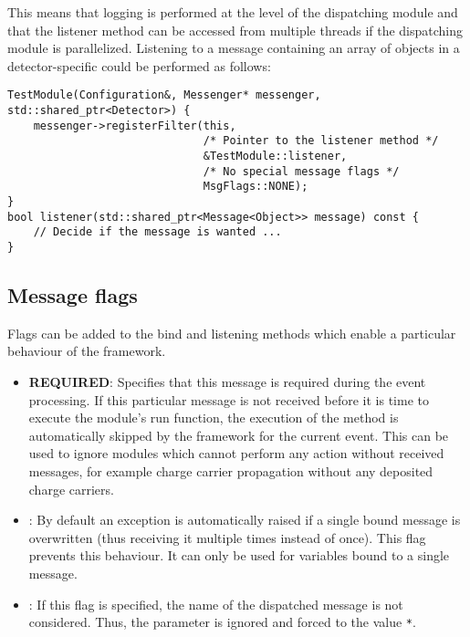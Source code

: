 \begin{enumerate}
This means that logging is performed at the level of the dispatching module and that the listener method can be accessed from multiple threads if the dispatching module is parallelized.
Listening to a message containing an array of objects in a detector-specific  could be performed as follows:
\begin{verbatim}
TestModule(Configuration&, Messenger* messenger, std::shared_ptr<Detector>) {
    messenger->registerFilter(this,
                              /* Pointer to the listener method */
                              &TestModule::listener,
                              /* No special message flags */
                              MsgFlags::NONE);
}
bool listener(std::shared_ptr<Message<Object>> message) const {
    // Decide if the message is wanted ...
}
\end{verbatim}
\end{enumerate}

\subsection{Message flags}
Flags can be added to the bind and listening methods which enable a particular behaviour of the framework.
\begin{itemize}
    \item \textbf{REQUIRED}: Specifies that this message is required during the event processing.
    If this particular message is not received before it is time to execute the module's run function, the execution of the method is automatically skipped by the framework for the current event.
    This can be used to ignore modules which cannot perform any action without received messages, for example charge carrier propagation without any deposited charge carriers.
    \item {}: By default an exception is automatically raised if a single bound message is overwritten (thus receiving it multiple times instead of once).
    This flag prevents this behaviour.
    It can only be used for variables bound to a single message.
    \item {}: If this flag is specified, the name of the dispatched message is not considered.
    Thus, the  parameter is ignored and forced to the value \texttt{*}.
\end{itemize}

